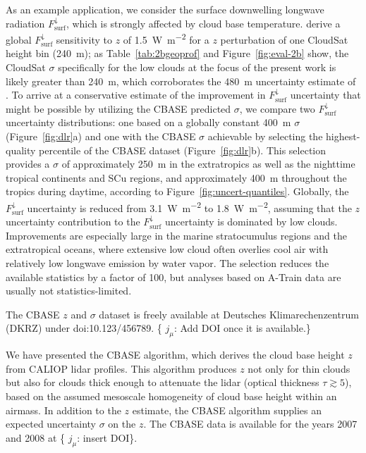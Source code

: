 \documentclass[essd,manuscript]{copernicus}\usepackage[]{graphicx}\usepackage[]{color}
\newcommand{\hlnum}[1]{\textcolor[rgb]{0.686,0.059,0.569}{#1}}%
\newcommand\comment[2]{\{\hlnum{ \textit{#1}: #2}\}}
\newcommand\commentjm[1]{\comment{$j_\mu$}{#1}}
\newcommand\CBH{\ensuremath{z}}
\newcommand\DLR{\ensuremath{F_\text{surf}^\downarrow}}
\begin{document}
As an example application, we consider the surface downwelling longwave
radiation \DLR{}, which is strongly affected by cloud base temperature.
\cite{Henderson2013} derive a global \DLR{} sensitivity to \CBH{} of
1.5~\unit{W~m^{-2}} for a \CBH{} perturbation of one CloudSat height bin
(240~\unit{m}); as Table~\ref{tab:2bgeoprof} and Figure~\ref{fig:eval-2b} show,
the CloudSat $\sigma$ specifically for the low clouds at the focus of the
present work is likely greater than 240~\unit{m}, which corroborates the
480~\unit{m} uncertainty estimate of \cite{Kato2011}. To arrive at a
conservative estimate of the improvement in \DLR{} uncertainty that might be
possible by utilizing the CBASE predicted $\sigma$, we compare two \DLR{}
uncertainty distributions: one based on a globally constant 400~\unit{m} $\sigma$
(Figure~\ref{fig:dlr}a) and one with the CBASE $\sigma$ achievable by selecting
the highest-quality percentile of the CBASE dataset
(Figure~\ref{fig:dlr}b). This selection provides a $\sigma$ of approximately
250~\unit{m} in the extratropics as well as the nighttime tropical continents
and SCu regions, and approximately 400~\unit{m} throughout the tropics during
daytime, according to Figure~\ref{fig:uncert-quantiles}.  Globally, the \DLR{}
uncertainty is reduced from 3.1~\unit{W~m^{-2}} to 1.8~\unit{W~m^{-2}}, assuming
that the \CBH{} uncertainty contribution to the \DLR{} uncertainty is dominated
by low clouds.  Improvements are especially large in the marine stratocumulus
regions and the extratropical oceans, where extensive low cloud often overlies
cool air with relatively low longwave emission by water vapor. The selection
reduces the available statistics by a factor of 100, but analyses based on
A-Train data are usually not statistics-limited.

The CBASE \CBH{} and $\sigma$ dataset \citep{cbase} is freely available at
Deutsches Klimarechenzentrum (DKRZ) under doi:10.123/456789.  \commentjm{Add DOI
once it is available.}

\conclusions
\label{sec:conclusions}

We have presented the CBASE algorithm, which derives the cloud base height \CBH{} from CALIOP lidar
profiles.  This algorithm produces \CBH{} not only for thin clouds but also for
clouds thick enough to attenuate the lidar (optical thickness $\tau \gtrsim 5$),
based on the assumed mesoscale homogeneity of cloud base height within an
airmass.  In addition to the \CBH{} estimate, the CBASE algorithm supplies an
expected uncertainty $\sigma$ on the \CBH{}.  The CBASE data is available for the years 2007
and 2008 at \commentjm{insert DOI}.
\end{document}
